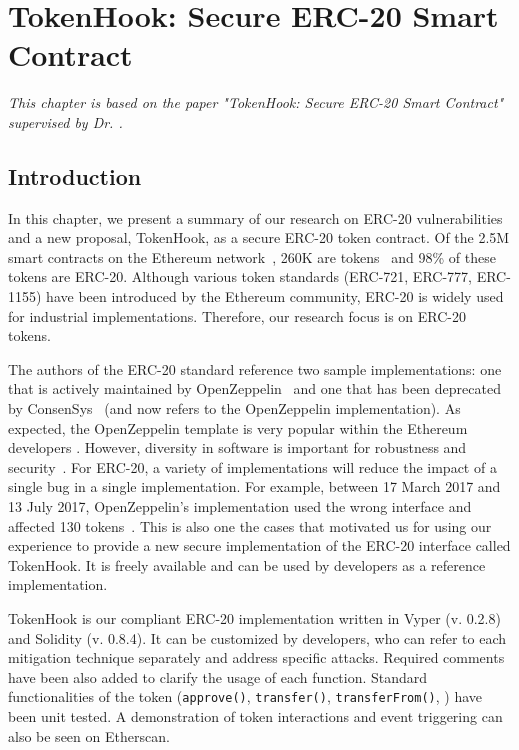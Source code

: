 
\chapter{TokenHook: Secure ERC-20 Smart Contract}\label{ch:tokenhook}

\textit{This chapter is based on the paper "TokenHook: Secure ERC-20 Smart Contract"~\cite{token2021} supervised by Dr. \supv.}
	
\section{Introduction}
In this chapter, we present a summary of our research on ERC-20 vulnerabilities and a new proposal, TokenHook, as a secure ERC-20 token contract. Of the 2.5M smart contracts on the Ethereum network~\cite{Alethio}, 260K are tokens~\cite{TokenTracker} and 98\% of these tokens are ERC-20. Although various token standards (\eg ERC-721, ERC-777, ERC-1155) have been introduced by the Ethereum community, ERC-20 is widely used for industrial implementations. Therefore, our research focus is on ERC-20 tokens.

The authors of the ERC-20 standard reference two sample implementations: one that is actively maintained by OpenZeppelin~\cite{OpenZeppelin_Token} and one that has been deprecated by ConsenSys~\cite{ConsenSys_Token} (and now refers to the OpenZeppelin implementation). As expected, the OpenZeppelin template is very popular within the Ethereum developers \cite{OpenZeppelin1,OpenZeppelin2,OpenZeppelin3}. However, diversity in software is important for robustness and security~\cite{FSA97,FHS97}. For ERC-20, a variety of implementations will reduce the impact of a single bug in a single implementation. For example, between 17 March 2017 and 13 July 2017, OpenZeppelin's implementation used the wrong interface and affected 130 tokens~\cite{TokenBug}. This is also one the cases that motivated us for using our experience to provide a new secure implementation of the ERC-20 interface called TokenHook. It is freely available and can be used by developers as a reference implementation.

TokenHook is our compliant ERC-20 implementation written in Vyper (v. 0.2.8) and Solidity (v. 0.8.4). It can be customized by developers, who can refer to each mitigation technique separately and address specific attacks. Required comments have been also added to clarify the usage of each function. Standard functionalities of the token (\ie   \texttt{approve()}, \texttt{transfer()}, \texttt{transferFrom()}, \etc) have been unit tested. A demonstration of token interactions and event triggering can also be seen on Etherscan. 

